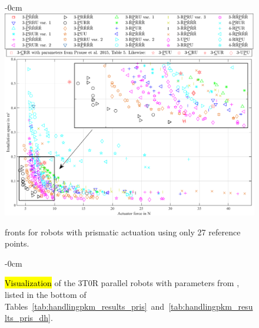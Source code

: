 \begin{figure}[H]
  \begin{adjustwidth}{-\extralength}{0cm}
    \centering
    \includegraphics{Figures/handlingpkm_pareto_actforce_installspace_groups_onlypoints_prismatic.pdf}
  \end{adjustwidth}
  \caption[Handling task:  fronts for robots with prismatic actuation using only 27 reference points]{ fronts for robots with prismatic actuation using only 27 reference points.}%
\label{fig:handlingpkm_pareto_prismatic_onlypoints}
\end{figure}


\begin{figure}[H]
%
\begin{adjustwidth}{-\extralength}{0cm}
  \centering
  \graphicspath{{Figures}}
  
\end{adjustwidth}
%
\caption{\hl{Visualization} %
  of the 3T0R parallel robots with parameters from \cite{PrauseChaCor2015}, listed in the bottom of Tables~\ref{tab:handlingpkm_results_pris}~and~\ref{tab:handlingpkm_results_pris_dh}.}
\label{fig:handlingpkm_robots_reference}
\end{figure}

